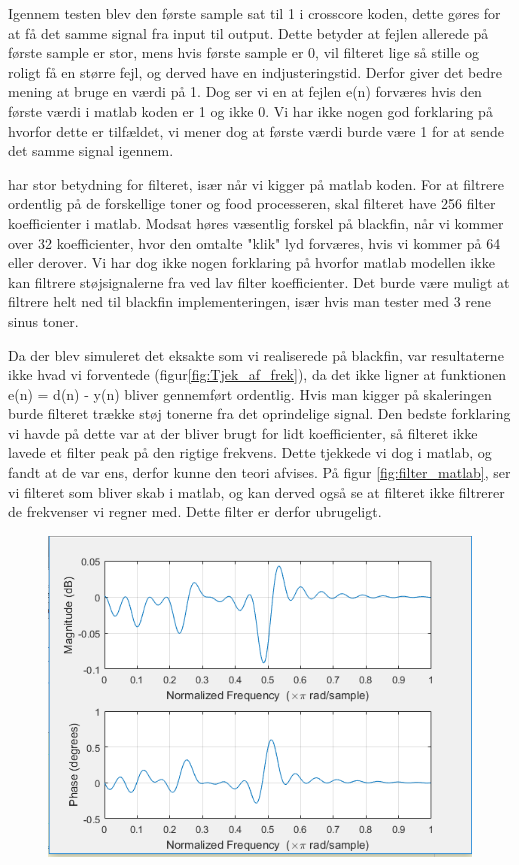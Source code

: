 \begin{description}[align=left]
\item [Første sample = 1.] Igennem testen blev den første sample sat til 1 i crosscore koden, dette gøres for at få det samme signal fra input til output. Dette betyder at fejlen allerede på første sample er stor, mens hvis første sample er 0, vil filteret lige så stille og roligt få en større fejl, og derved have en indjusteringstid. Derfor giver det bedre mening at bruge en værdi på 1. Dog ser vi en at fejlen e(n) forværes hvis den første værdi i matlab koden er 1 og ikke 0. Vi har ikke nogen god forklaring på hvorfor dette er tilfældet, vi mener dog at første værdi burde være 1 for at sende det samme signal igennem. 
\item [Filter koefficienter] har stor betydning for filteret, især når vi kigger på matlab koden. For at filtrere ordentlig på de forskellige toner og food processeren, skal filteret have 256 filter koefficienter i matlab. Modsat høres væsentlig forskel på blackfin, når vi kommer over 32 koefficienter, hvor den omtalte "klik" lyd forværes, hvis vi kommer på 64 eller derover. Vi har dog ikke nogen forklaring på hvorfor matlab modellen ikke kan filtrere støjsignalerne fra ved lav filter koefficienter. Det burde være muligt at filtrere helt ned til blackfin implementeringen, især hvis man tester med 3 rene sinus toner.   
\item [Simulering af realiseringen.] 
Da der blev simuleret det eksakte som vi realiserede på blackfin, var resultaterne  ikke hvad vi forventede (figur\ref{fig:Tjek_af_frek}), da det ikke ligner at funktionen e(n) = d(n) - y(n) bliver gennemført ordentlig. Hvis man kigger på skaleringen burde filteret trække støj tonerne fra det oprindelige signal. Den bedste forklaring vi havde på dette var at der bliver brugt for lidt koefficienter, så filteret ikke lavede et filter peak på den rigtige frekvens. Dette tjekkede vi dog i matlab, og fandt at de var ens, derfor kunne den teori afvises. 
På figur \ref{fig:filter_matlab}, ser vi filteret som bliver skab i matlab, og kan derved også se at filteret ikke filtrerer de frekvenser vi regner med. Dette filter er derfor ubrugeligt. 
\begin{figure}[H]
	\centering
	\includegraphics[width = 400pt]{Img/filter_matlab}

\end{figure}
\end{description}
